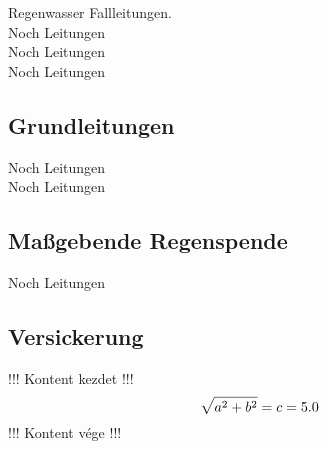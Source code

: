 \documentclass[12pt]{report}
\begin{document}
Regenwasser Fallleitungen.\\
Noch Leitungen\\
Noch Leitungen\\
Noch Leitungen\\

\subsection*{Grundleitungen}

Noch Leitungen\\
Noch Leitungen\\

\subsection*{Maßgebende Regenspende}

Noch Leitungen\\

\subsection*{Versickerung}

!!! Kontent kezdet !!!\\
\begin{equation}
\sqrt{a^2 + b^2} = c = 5.0 \\
\end{equation}
!!! Kontent vége !!!\\




\end{document}
